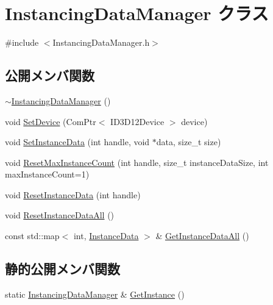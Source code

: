 \hypertarget{class_instancing_data_manager}{}\section{Instancing\+Data\+Manager クラス}
\label{class_instancing_data_manager}


{\ttfamily \#include $<$Instancing\+Data\+Manager.\+h$>$}

\subsection*{公開メンバ関数}
\begin{DoxyCompactItemize}
\item 
\mbox{\hyperlink{class_instancing_data_manager_a9c92fc5fec3ab4f5e45c7fbec43077b3}{$\sim$\+Instancing\+Data\+Manager}} ()
\item 
void \mbox{\hyperlink{class_instancing_data_manager_abb3c9344caa705ab9898af4f0728a020}{Set\+Device}} (Com\+Ptr$<$ I\+D3\+D12\+Device $>$ device)
\item 
void \mbox{\hyperlink{class_instancing_data_manager_a1f2a99ea178b9ba80e2dc3772f16d347}{Set\+Instance\+Data}} (int handle, void $\ast$data, size\+\_\+t size)
\item 
void \mbox{\hyperlink{class_instancing_data_manager_acce3b27d340bdd273b6634f97f5a8ab3}{Reset\+Max\+Instance\+Count}} (int handle, size\+\_\+t instance\+Data\+Size, int max\+Instance\+Count=1)
\item 
void \mbox{\hyperlink{class_instancing_data_manager_afc81462cef5a960eae978e6e56d22c98}{Reset\+Instance\+Data}} (int handle)
\item 
void \mbox{\hyperlink{class_instancing_data_manager_aaf44f22cf99babd3bdd782d8e534124d}{Reset\+Instance\+Data\+All}} ()
\item 
const std\+::map$<$ int, \mbox{\hyperlink{struct_instance_data}{Instance\+Data}} $>$ \& \mbox{\hyperlink{class_instancing_data_manager_a3753bcd17c77cfccf3d758522009b56e}{Get\+Instance\+Data\+All}} ()
\end{DoxyCompactItemize}
\subsection*{静的公開メンバ関数}
\begin{DoxyCompactItemize}
\item 
static \mbox{\hyperlink{class_instancing_data_manager}{Instancing\+Data\+Manager}} \& \mbox{\hyperlink{class_instancing_data_manager_a6e901cdd290e8bb84cef9692bb8a3db8}{Get\+Instance}} ()
\end{DoxyCompactItemize}



